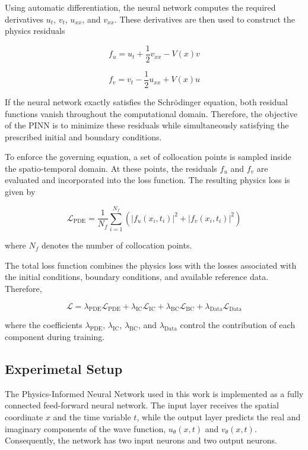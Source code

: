 \documentclass[11pt]{article}
\begin{document}
Using automatic differentiation, the neural network computes the required derivatives $u_t$, $v_t$, $u_{xx}$, and $v_{xx}$. These derivatives are then used to construct the physics residuals

\begin{equation}
f_u
=
u_t
+
\frac{1}{2}v_{xx}
-
V(x)v
\end{equation}

\begin{equation}
f_v
=
v_t
-
\frac{1}{2}u_{xx}
+
V(x)u
\end{equation}

If the neural network exactly satisfies the Schrödinger equation, both residual functions vanish throughout the computational domain. Therefore, the objective of the PINN is to minimize these residuals while simultaneously satisfying the prescribed initial and boundary conditions.

To enforce the governing equation, a set of collocation points is sampled inside the spatio-temporal domain. At these points, the residuals $f_u$ and $f_v$ are evaluated and incorporated into the loss function. The resulting physics loss is given by

\begin{equation}
\mathcal{L}_{\mathrm{PDE}}
=
\frac{1}{N_f}
\sum_{i=1}^{N_f}
\left(
|f_u(x_i,t_i)|^2
+
|f_v(x_i,t_i)|^2
\right)
\end{equation}

where $N_f$ denotes the number of collocation points.

The total loss function combines the physics loss with the losses associated with the initial conditions, boundary conditions, and available reference data. Therefore,

\begin{equation}
\mathcal{L}
=
\lambda_{\mathrm{PDE}}\mathcal{L}_{\mathrm{PDE}}
+
\lambda_{\mathrm{IC}}\mathcal{L}_{\mathrm{IC}}
+
\lambda_{\mathrm{BC}}\mathcal{L}_{\mathrm{BC}}
+
\lambda_{\mathrm{Data}}\mathcal{L}_{\mathrm{Data}}
\end{equation}

where the coefficients $\lambda_{\mathrm{PDE}}$, $\lambda_{\mathrm{IC}}$, $\lambda_{\mathrm{BC}}$, and $\lambda_{\mathrm{Data}}$ control the contribution of each component during training.
\subsection{Experimetal Setup}

The Physics-Informed Neural Network used in this work is implemented as a fully connected feed-forward neural network. The input layer receives the spatial coordinate $x$ and the time variable $t$, while the output layer predicts the real and imaginary components of the wave function, $u_\theta(x,t)$ and $v_\theta(x,t)$. Consequently, the network has two input neurons and two output neurons.
\end{document}
